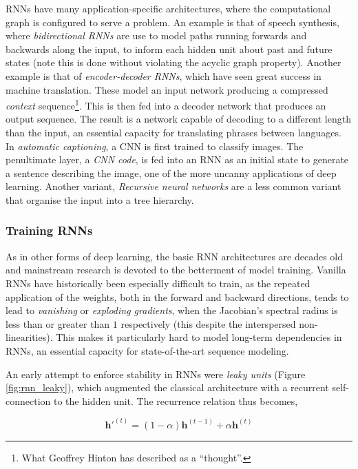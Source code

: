 \documentclass[11pt]{amsart}
\begin{document}
RNNs have many application-specific architectures, where the computational graph is configured to serve a problem. An example is that of speech synthesis, where \emph{bidirectional RNNs} are use to model paths running forwards and backwards along the input, to inform each hidden unit about past and future states (note this is done without violating the acyclic graph property). Another example is that of \emph{encoder-decoder RNNs}, which have seen great success in machine translation. These model an input network producing a compressed \emph{context} sequence\footnote{What Geoffrey Hinton has described as a ``thought''.}. This is then fed into a decoder network that produces an output sequence. The result is a network capable of decoding to a different length than the input, an essential capacity for translating phrases between languages. In \emph{automatic captioning}, a CNN is first trained to classify images. The penultimate layer, a \emph{CNN code}, is fed into an RNN as an initial state to generate a sentence describing the image, one of the more uncanny applications of deep learning. Another variant, \emph{Recursive neural networks} are a less common variant that organise the input into a tree hierarchy.

\subsubsection{Training RNNs}

As in other forms of deep learning, the basic RNN architectures are decades old and mainstream research is devoted to the betterment of model training. Vanilla RNNs have historically been especially difficult to train, as the repeated application of the weights, both in the forward and backward directions, tends to lead to \emph{vanishing} or \emph{exploding gradients}, when the Jacobian's spectral radius is less than or greater than $1$ respectively (this despite the interspersed non-linearities). This makes it particularly hard to model long-term dependencies in RNNs, an essential capacity for state-of-the-art sequence modeling.

An early attempt to enforce stability in RNNs were \emph{leaky units} (Figure \ref{fig:rnn_leaky}), which augmented the classical architecture with a recurrent self-connection to the hidden unit. The recurrence relation thus becomes,

$$\mathbf{h}'^{(t)} = (1 - \alpha)\mathbf{h}^{(t - 1)} + \alpha\mathbf{h}^{(t)}$$
\end{document}
